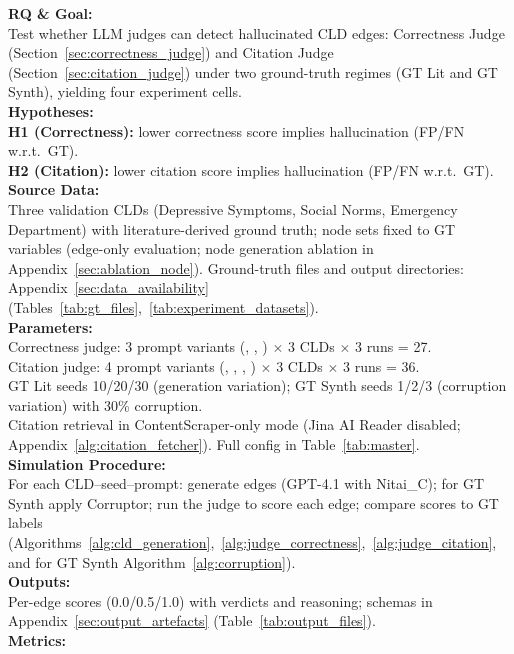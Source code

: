 \noindent\textbf{RQ \& Goal:}\\
Test whether LLM judges can detect hallucinated CLD edges: Correctness Judge (Section~\ref{sec:correctness_judge}) and Citation Judge (Section~\ref{sec:citation_judge}) under two ground-truth regimes (GT Lit and GT Synth), yielding four experiment cells.\\
\textbf{Hypotheses:}\\
\textbf{H1 (Correctness):} lower correctness score implies hallucination (FP/FN w.r.t.\ GT).\\
\textbf{H2 (Citation):} lower citation score implies hallucination (FP/FN w.r.t.\ GT).\\
\textbf{Source Data:}\\
Three validation CLDs (Depressive Symptoms, Social Norms, Emergency Department) with literature-derived ground truth; node sets fixed to GT variables (edge-only evaluation; node generation ablation in Appendix~\ref{sec:ablation_node}). Ground-truth files and output directories: Appendix~\ref{sec:data_availability} (Tables~\ref{tab:gt_files},~\ref{tab:experiment_datasets}).\\
\textbf{Parameters:}\\
Correctness judge: 3 prompt variants (\PromptBaseline, \PromptCoT, \PromptMechanistic) $\times$ 3 CLDs $\times$ 3 runs = 27.\\
Citation judge: 4 prompt variants (\PromptBaseline, \PromptCoT, \PromptMechanistic, \PromptMechanisticLit) $\times$ 3 CLDs $\times$ 3 runs = 36.\\
GT Lit seeds 10/20/30 (generation variation); GT Synth seeds 1/2/3 (corruption variation) with 30\% corruption.\\
Citation retrieval in ContentScraper-only mode (Jina AI Reader disabled; Appendix~\ref{alg:citation_fetcher}). Full config in Table~\ref{tab:master}.\\
\textbf{Simulation Procedure:}\\
For each CLD--seed--prompt: generate edges (GPT-4.1 with Nitai\_C); for GT Synth apply Corruptor; run the judge to score each edge; compare scores to GT labels (Algorithms~\ref{alg:cld_generation},~\ref{alg:judge_correctness},~\ref{alg:judge_citation}, and for GT Synth Algorithm~\ref{alg:corruption}).\\
\textbf{Outputs:}\\
Per-edge scores (0.0/0.5/1.0) with verdicts and reasoning; schemas in Appendix~\ref{sec:output_artefacts} (Table~\ref{tab:output_files}).\\
\textbf{Metrics:}\\
